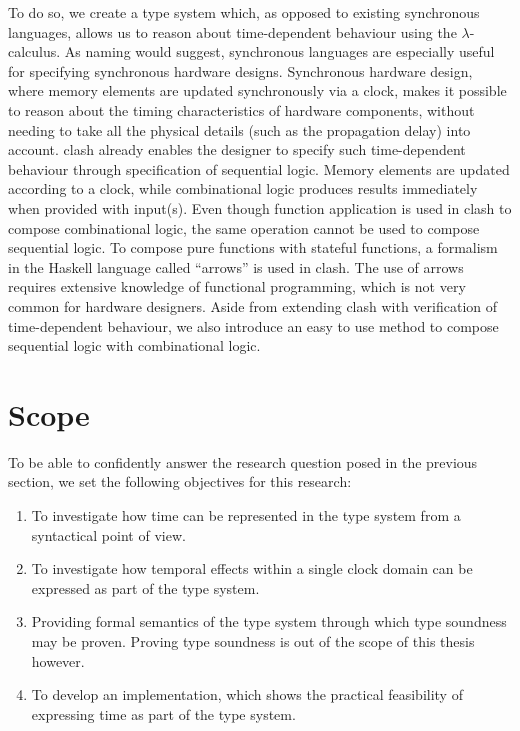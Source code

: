 To do so, we create a type system which, as opposed to existing synchronous languages, allows us to reason about time-dependent behaviour using the $\lambda$-calculus.
As naming would suggest, synchronous languages are especially useful for specifying synchronous hardware designs.
Synchronous hardware design, where memory elements are updated synchronously via a clock, makes it possible to reason about the timing characteristics of hardware components, without needing to take all the physical details (such as the propagation delay) into account.
\gls{clash} already enables the designer to specify such time-dependent behaviour through specification of sequential logic.
Memory elements are updated according to a clock, while combinational logic produces results immediately when provided with input(s).
Even though function application is used in \gls{clash} to compose combinational logic, the same operation cannot be used to compose sequential logic.
To compose pure functions with stateful functions, a formalism in the Haskell language called ``arrows''\cite{hughes2000generalising} is used\cite{gerards2011higher} in \gls{clash}.
The use of arrows requires extensive knowledge of functional programming, which is not very common for hardware designers.
Aside from extending \gls{clash} with verification of time-dependent behaviour, we also introduce an easy to use method to compose sequential logic with combinational logic.

\section{Scope} \label{sec:scope}
To be able to confidently answer the research question posed in the previous section, we set the following objectives for this research:
\begin{enumerate}
 \item  To investigate how time can be represented in the type system from a syntactical point of view.
 \item  To investigate how temporal effects within a single clock domain can be expressed as part of the type system.
 \item  Providing formal semantics of the type system through which type soundness may be proven. 
        Proving type soundness is out of the scope of this thesis however.
 \item  To develop an implementation, which shows the practical feasibility of expressing time as part of the type system.
\end{enumerate}

